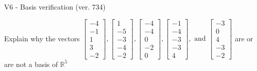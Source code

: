 \begin{exercise}
  \begin{exerciseTitle}V6 - Basis verification (ver. 734)\end{exerciseTitle}
  \begin{exerciseStatement}
    Explain why the vectors \(\left[\begin{array}{r}
-4 \\
-1 \\
1 \\
3 \\
-2
\end{array}\right] , \left[\begin{array}{r}
1 \\
-5 \\
-3 \\
-4 \\
-2
\end{array}\right] , \left[\begin{array}{r}
-4 \\
-4 \\
0 \\
-2 \\
0
\end{array}\right] , \left[\begin{array}{r}
-1 \\
-4 \\
-3 \\
-3 \\
4
\end{array}\right] , \text{ and } \left[\begin{array}{r}
-3 \\
0 \\
4 \\
-3 \\
-2
\end{array}\right]\) are or are not a basis of \(\mathbb{R}^5\)	



\end{exerciseStatement}
\end{exercise}
